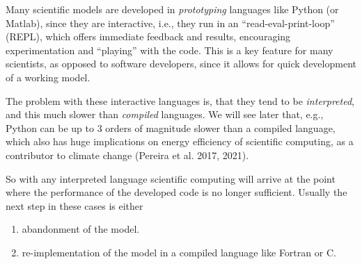 \documentclass[
  a4paper,
  DIV=11,
  numbers=noendperiod,
  oneside]{scrreprt}
\begin{document}
Many scientific models are developed in \emph{prototyping} languages
like Python (or Matlab), since they are interactive, i.e., they run in
an ``read-eval-print-loop'' (REPL), which offers immediate feedback and
results, encouraging experimentation and ``playing'' with the code. This
is a key feature for many scientists, as opposed to software developers,
since it allows for quick development of a working model.

The problem with these interactive languages is, that they tend to be
\emph{interpreted}, and this much slower than \emph{compiled} languages.
We will see later that, e.g., Python can be up to 3 orders of magnitude
slower than a compiled language, which also has huge implications on
energy efficiency of scientific computing, as a contributor to climate
change (Pereira et al. 2017,
2021).

So with any interpreted language scientific computing will arrive at the
point where the performance of the developed code is no longer
sufficient. Usually the next step in these cases is either

\begin{enumerate}
\def\labelenumi{\alph{enumi}.}
\item
  abandonment of the model.
\item
  re-implementation of the model in a compiled language like Fortran or
  C.
\end{enumerate}
\end{document}
